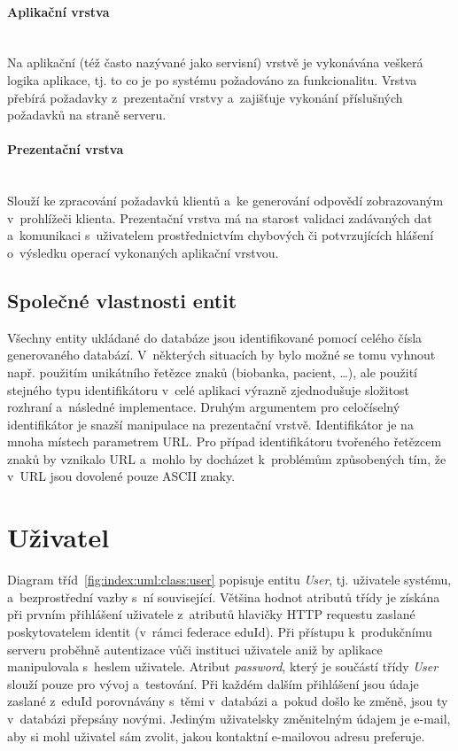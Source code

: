 \documentclass[11pt, final, oneside]{fithesis2}
\newcommand{\paragraphNewLine}[1]{\paragraph*{#1}\mbox{}\\}
\begin{document}
\paragraphNewLine{Aplikační vrstva} 
Na aplikační (též často nazývané jako servisní) vrstvě je vykonávána veškerá logika aplikace, tj. to co je po systému požadováno za funkcionalitu. Vrstva přebírá požadavky z~prezentační vrstvy a~zajišťuje vykonání příslušných požadavků na straně serveru. 

\paragraphNewLine{Prezentační vrstva} 
Slouží ke zpracování požadavků klientů a~ke generování odpovědí zobrazovaným v~prohlížeči klienta. Prezentační vrstva má na starost validaci zadávaných dat a~komunikaci s~uživatelem prostřednictvím chybových či potvrzujících hlášení o~výsledku operací vykonaných aplikační vrstvou. 

\subsection{Společné vlastnosti entit}
Všechny entity ukládané do databáze jsou identifikované pomocí celého čísla generovaného databází. V~některých situacích by bylo možné se tomu vyhnout např. použitím unikátního řetězce znaků (biobanka, pacient, \ldots), ale použití stejného typu identifikátoru v~celé aplikaci výrazně zjednodušuje složitost rozhraní a~následné implementace. Druhým argumentem pro celočíselný identifikátor je snazší manipulace na prezentační vrstvě. Identifikátor je na mnoha místech parametrem URL. Pro případ identifikátoru tvořeného řetězcem znaků by vznikalo  URL a~mohlo by docházet k~problémům způsobených tím, že v~URL jsou dovolené pouze ASCII znaky.

\section{Uživatel}
Diagram tříd~\ref{fig:index:uml:class:user} popisuje entitu \textit{User}, tj. uživatele systému, a~bezprostřední vazby s~ní související. Většina hodnot atributů třídy je získána při prvním přihlášení uživatele z~atributů hlavičky HTTP requestu zaslané poskytovatelem identit (v~rámci federace eduId). Při přístupu k~produkčnímu serveru proběhně autentizace vůči  instituci uživatele aniž by aplikace manipulovala s~heslem uživatele. Atribut \textit{password}, který je součástí třídy \textit{User} slouží pouze pro vývoj a~testování. 
Při každém dalším přihlášení jsou údaje zaslané z~eduId porovnávány s~těmi v~databázi a~pokud došlo ke změně, jsou ty v~databázi přepsány novými. Jediným uživatelsky změnitelným údajem je e-mail, aby si mohl uživatel sám zvolit, jakou kontaktní e-mailovou adresu preferuje.
\end{document}
